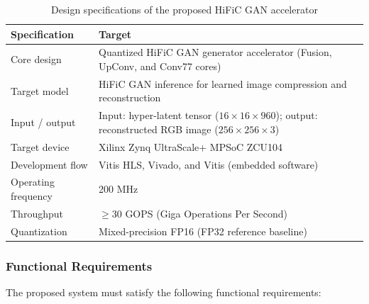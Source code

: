 \begin{table}[H]
\centering
\caption{Design specifications of the proposed HiFiC GAN accelerator}
\label{tab:design_specs}
\begin{tabularx}{\textwidth}{|>{\raggedright\arraybackslash}p{}|X|}
\hline
\textbf{Specification} & \textbf{Target} \\
\hline
Core design & Quantized HiFiC GAN generator accelerator (Fusion, UpConv, and Conv77 cores) \\
\hline
Target model & HiFiC GAN inference for learned image compression and reconstruction \\
\hline
Input / output & Input: hyper-latent tensor ($16 \times 16 \times 960$); output: reconstructed RGB image ($256 \times 256 \times 3$) \\
\hline
Target device & Xilinx Zynq UltraScale+ MPSoC ZCU104 \\
\hline
Development flow & Vitis HLS, Vivado, and Vitis (embedded software) \\
\hline
Operating frequency & 200 MHz \\
\hline
Throughput & $\geq 30$ GOPS (Giga Operations Per Second) \\
\hline
Quantization & Mixed-precision FP16 (FP32 reference baseline) \\
\hline
\end{tabularx}
\end{table}

\subsubsection{Functional Requirements}

The proposed system must satisfy the following functional requirements:

